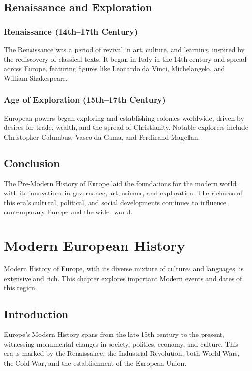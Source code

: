 \documentclass[a4paper,12pt]{book}
\begin{document}
\section{Renaissance and Exploration}
\label{sec:renaissance-exploration}
\subsection{Renaissance (14th–17th Century)}
The Renaissance was a period of revival in art, culture, and learning, inspired by the rediscovery of classical texts. It began in Italy in the 14th century and spread across Europe, featuring figures like Leonardo da Vinci, Michelangelo, and William Shakespeare.

\subsection{Age of Exploration (15th–17th Century)}
European powers began exploring and establishing colonies worldwide, driven by desires for trade, wealth, and the spread of Christianity. Notable explorers include Christopher Columbus, Vasco da Gama, and Ferdinand Magellan.

\section{Conclusion}
\label{sec:conclusion-pre-modern-europe}
The Pre-Modern History of Europe laid the foundations for the modern world, with its innovations in governance, art, science, and exploration. The richness of this era’s cultural, political, and social developments continues to influence contemporary Europe and the wider world.

\chapter{Modern European History}
\label{ch:modern-european-history}

Modern History of Europe, with its diverse mixture of cultures and languages, is extensive and rich. This chapter explores important Modern events and dates of this region.

\section{Introduction}
\label{sec:introduction-modern-europe}
Europe's Modern History spans from the late 15th century to the present, witnessing monumental changes in society, politics, economy, and culture. This era is marked by the Renaissance, the Industrial Revolution, both World Wars, the Cold War, and the establishment of the European Union.
\end{document}
